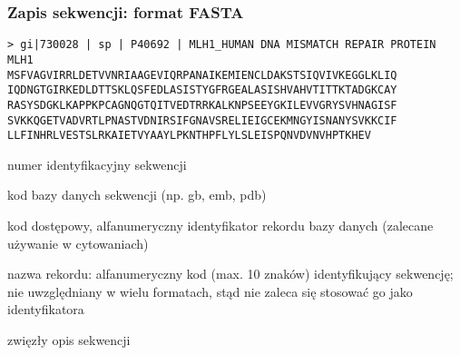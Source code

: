 \begin{frame}[fragile]
\frametitle{Zapis sekwencji: format FASTA}

\begin{Verbatim}[fontsize=\tiny, frame=single, framesep=3mm, commandchars=\\\{\}]
> gi|730028 | sp | P40692 | MLH1_HUMAN DNA MISMATCH REPAIR PROTEIN MLH1 
MSFVAGVIRRLDETVVNRIAAGEVIQRPANAIKEMIENCLDAKSTSIQVIVKEGGLKLIQ
IQDNGTGIRKEDLDTTSKLQSFEDLASISTYGFRGEALASISHVAHVTITTKTADGKCAY
RASYSDGKLKAPPKPCAGNQGTQITVEDTRRKALKNPSEEYGKILEVVGRYSVHNAGISF
SVKKQGETVADVRTLPNASTVDNIRSIFGNAVSRELIEIGCEKMNGYISNANYSVKKCIF
LLFINHRLVESTSLRKAIETVYAAYLPKNTHPFLYLSLEISPQNVDVNVHPTKHEV
\end{Verbatim}

\begin{description}\scriptsize
 \item[\tb{\wor{gi|730028}}] numer identyfikacyjny sekwencji
 
 \item[\tb{\wgre{sp}}] kod bazy danych sekwencji (np. gb, emb, pdb)

 \item[\tb{\wbl{P40692}}] kod dostępowy, alfanumeryczny identyfikator
 rekordu bazy danych (zalecane używanie w cytowaniach)

 \item[\tb{\wpi{MLH1\_HUMAN}}] nazwa rekordu: alfanumeryczny kod
 (max. 10 znaków) identyfikujący sekwencję; nie uwzględniany w wielu
 formatach, stąd nie zaleca się stosować go jako identyfikatora

 \item[\tb{\wgo{DNA MISMATCH..}}] zwięzły opis sekwencji
\end{description}
\end{frame}


